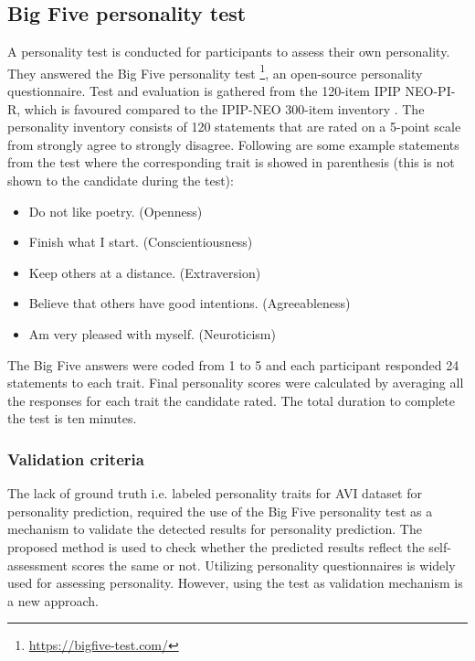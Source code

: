 \subsection{Big Five personality test}
A personality test is conducted for participants to assess their own personality. They answered the Big Five personality test \footnote{\url{https://bigfive-test.com/}}, an open-source personality questionnaire. Test and evaluation is gathered from the 120-item IPIP NEO-PI-R, which is favoured compared to the IPIP-NEO 300-item inventory \cite{JOHNSON201478}. The personality inventory consists of 120 statements that are rated on a 5-point scale from strongly agree to strongly disagree. Following are some example statements from the test where the corresponding trait is showed in parenthesis (this is not shown to the candidate during the test):
%
\begin{itemize}
    \item Do not like poetry. (Openness)
    \item Finish what I start. (Conscientiousness)
    \item Keep others at a distance. (Extraversion)
    \item Believe that others have good intentions. (Agreeableness)
    \item Am very pleased with myself. (Neuroticism)
\end{itemize}
%
The Big Five answers were coded from 1 to 5 and each participant responded 24 statements to each trait. Final personality scores were calculated by averaging all the responses for each trait the candidate rated. The total duration to complete the test is ten minutes. 

\subsubsection{Validation criteria}
The lack of ground truth i.e. labeled personality traits for AVI dataset for personality prediction, required the use of the Big Five personality test as a mechanism to validate the detected results for personality prediction. The proposed method is used to check whether the predicted results reflect the self-assessment scores the same or not. Utilizing personality questionnaires is widely used for assessing personality. However, using the test as validation mechanism is a new approach. 

